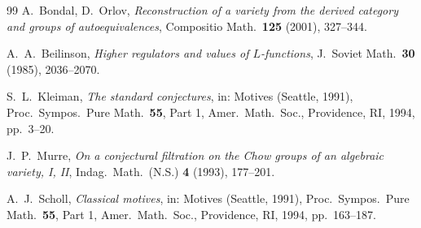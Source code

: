 \documentclass[12pt,a4paper]{amsart}
\theoremstyle{definition}
\begin{document}
\begin{thebibliography}{99}
A.\ Bondal, D.\ Orlov,
\textit{Reconstruction of a variety from the derived category and groups of autoequivalences},
Compositio Math.\ \textbf{125} (2001), 327--344.

A.\ A.\ Beilinson,
\textit{Higher regulators and values of $L$-functions},
J.\ Soviet Math.\ \textbf{30} (1985), 2036--2070.

S.\ L.\ Kleiman,
\textit{The standard conjectures},
in: Motives (Seattle, 1991), Proc.\ Sympos.\ Pure Math.\ \textbf{55}, Part 1,
Amer.\ Math.\ Soc., Providence, RI, 1994, pp.\ 3--20.

J.\ P.\ Murre,
\textit{On a conjectural filtration on the Chow groups of an algebraic variety, I, II},
Indag.\ Math.\ (N.S.) \textbf{4} (1993), 177--201.

A.\ J.\ Scholl,
\textit{Classical motives},
in: Motives (Seattle, 1991), Proc.\ Sympos.\ Pure Math.\ \textbf{55}, Part 1,
Amer.\ Math.\ Soc., Providence, RI, 1994, pp.\ 163--187.

\end{thebibliography}
\end{document}
